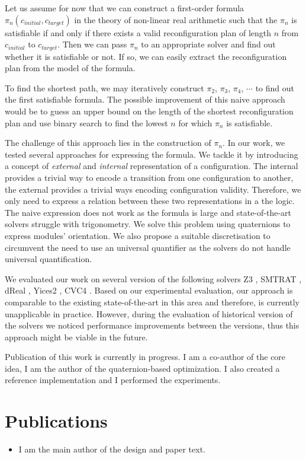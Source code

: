 Let us assume for now that we can construct a first-order formula
$\pi_{n}(c_{initial}, c_{target})$ in the theory of non-linear real arithmetic
such that the $\pi_n$ is satisfiable if and only if there exists a valid
reconfiguration plan of length $n$ from $c_{initial}$ to $c_{target}$. Then we
can pass $\pi_n$ to an appropriate solver and find out whether it is satisfiable
or not. If so, we can easily extract the reconfiguration plan from the model of
the formula.

To find the shortest path, we may iteratively construct $\pi_2$,
$\pi_3$, $\pi_4$, $\cdots$ to find out the first satisfiable formula. The
possible improvement of this naive approach would be to guess an upper bound on the
length of the shortest reconfiguration plan and use binary search to find the
lowest $n$ for which $\pi_n$ is satisfiable.

The challenge of this approach lies in the construction of $\pi_n$. In our work,
we tested several approaches for expressing the formula. We tackle it by
introducing a concept of \emph{external} and \emph{internal} representation of a
configuration. The internal provides a trivial way to  encode a transition from
one configuration to another, the external provides a trivial ways encoding
configuration validity. Therefore, we only need to express a relation between
these two representations in a the logic. The naive expression does not work as
the formula is large and state-of-the-art solvers struggle with trigonometry. We
solve this problem using quaternions to express modules' orientation. We also
propose a suitable discretisation to circumvent the need to use an universal
quantifier as the solvers do not handle universal quantification.

We evaluated our work on several version of the following solvers Z3
\cite{DBLP:conf/tacas/MouraB08}, SMTRAT \cite{DBLP:conf/sat/CorziliusKJSA15},
dReal \cite{DBLP:conf/cade/GaoKC13}, Yices2 \cite{DBLP:conf/cav/Dutertre14},
CVC4 \cite{DBLP:conf/cav/BarrettCDHJKRT11}. Based on our experimental
evaluation, our approach is comparable to the existing state-of-the-art in this
area and therefore, is currently unapplicable in practice. However, during the
evaluation of historical version of the solvers we noticed performance
improvements between the versions, thus this approach might be viable in the
future.

Publication of this work is currently in progress. I am a co-author
of the core idea, I am the author of the quaternion-based optimization. I also
created a reference implementation and I performed the experiments.

\section{Publications}

\begin{itemize}

    \item {}

    I am the main author of the design and paper text.
\end{itemize}